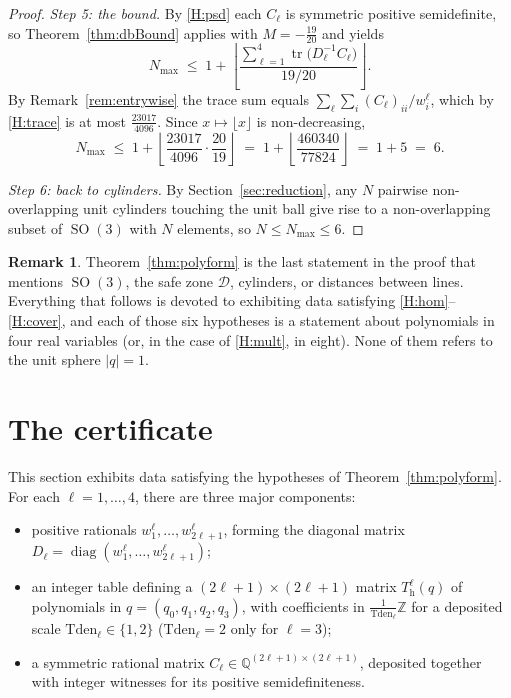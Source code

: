 \documentclass[reqno]{amsart}
\theoremstyle{definition}
\newtheorem{remark}[theorem]{Remark}
\DeclareMathOperator{\SO}{SO}
\DeclareMathOperator{\tr}{tr}
\DeclareMathOperator{\diag}{diag}
\newcommand{\Z}{\mathbb{Z}}
\newcommand{\Q}{\mathbb{Q}}
\newcommand{\Dom}{\mathcal{D}}
\begin{document}
\begin{proof}
\emph{Step 5: the bound.}
By \ref{H:psd} each $C_\ell$ is symmetric positive semidefinite, so
Theorem~\ref{thm:dbBound} applies with $M=-\tfrac{19}{20}$ and yields
\[
N_{\max}\;\le\;1+\left\lfloor\frac{\sum_{\ell=1}^{4}\tr\bigl(D_\ell^{-1}C_\ell\bigr)}
{19/20}\right\rfloor .
\]
By Remark~\ref{rem:entrywise} the trace sum equals $\sum_{\ell}\sum_i (C_\ell)_{ii}/w^\ell_i$,
which by \ref{H:trace} is at most $\tfrac{23017}{4096}$. Since $x\mapsto\lfloor x\rfloor$ is
non-decreasing,
\[
N_{\max}\;\le\;1+\left\lfloor\frac{23017}{4096}\cdot\frac{20}{19}\right\rfloor
\;=\;1+\left\lfloor\frac{460340}{77824}\right\rfloor\;=\;1+5\;=\;6.
\]

\emph{Step 6: back to cylinders.}
By Section~\ref{sec:reduction}, any $N$ pairwise non-overlapping unit cylinders touching the unit
ball give rise to a non-overlapping subset of $\SO(3)$ with $N$ elements, so
$N\le N_{\max}\le6$.
\end{proof}

 \begin{remark}\label{rem:noMoreSO3}
Theorem~\ref{thm:polyform} is the last statement in the proof that mentions $\SO(3)$, the safe
zone $\Dom$, cylinders, or distances between lines. Everything that follows is devoted to
exhibiting data satisfying \ref{H:hom}--\ref{H:cover}, and each of those six hypotheses is a
statement about polynomials in four real variables (or, in the case of \ref{H:mult}, in eight).
None of them refers to the unit sphere $|q|=1$.


\end{remark}

\section{The certificate}\label{sec:cert}

This section exhibits data satisfying the hypotheses of Theorem~\ref{thm:polyform}. For each $\ell=1,\dots,4$, there are three major components:
\begin{itemize}[leftmargin=1.4em]
\item positive rationals $w^\ell_1,\dots,w^\ell_{2\ell+1}$, forming the diagonal matrix
$D_\ell=\diag(w^\ell_1,\dots,w^\ell_{2\ell+1})$;
\item an integer table defining a $(2\ell+1)\times(2\ell+1)$ matrix $T^\ell_{\mathrm h}(q)$ of
polynomials in $q=(q_0,q_1,q_2,q_3)$, with coefficients in
$\tfrac1{\mathrm{Tden}_\ell}\Z$ for a deposited scale $\mathrm{Tden}_\ell\in\{1,2\}$
($\mathrm{Tden}_\ell=2$ only for $\ell=3$);
\item a symmetric rational matrix $C_\ell\in\Q^{(2\ell+1)\times(2\ell+1)}$, deposited together with
integer witnesses for its positive semidefiniteness.
\end{itemize}
\end{document}
